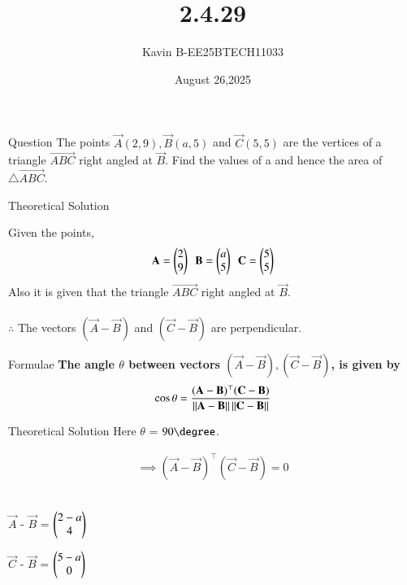 \documentclass{beamer}
\begin{document}
\title 
{2.4.29}
\date{August 26,2025}


\author 
{Kavin B-EE25BTECH11033}






\frame{\titlepage}
\begin{frame}{Question}
The points $\vec{A}(2, 9), \vec{B}(a, 5) $ and $\vec{C}(5, 5)$ are the vertices of a triangle $\vec{ABC}$ right angled at $\vec{B}$. Find the values of a and hence the area of $\triangle \vec{ABC}$.
\end{frame}



\begin{frame}{Theoretical Solution}

Given the points,
\begin{align}
    \vec{A}=\begin{myvec}{2\\9}\end{myvec}\ \ 
    \vec{B}=\begin{myvec}{a\\5}\end{myvec}\ \ 
    \vec{C}=\begin{myvec}{5\\5}\end{myvec}
\end{align}
Also it is given that the triangle $\vec{ABC}$ right angled at $\vec{B}$.\\
\\
$\therefore$ The vectors $(\vec{A}-\vec{B})$ and $(\vec{C}-\vec{B})$ are perpendicular.\\
\end{frame}

\begin{frame}{Formulae}
\textbf{The angle $\theta$ between vectors $(\vec{A}-\vec{B}), (\vec{C}-\vec{B})$, is given by } 
\begin{align}
	\label{eq:angle-inner}
		\cos\theta=\frac{{(\vec{A}-\vec{B})^{\top}}{(\vec{C}-\vec{B})}}{\norm{\vec{A}-\vec{B}}\norm{\vec{C}-\vec{B}}}
\end{align}
\end{frame}


\begin{frame}{Theoretical Solution}
Here $\theta$ = $90\degree$.

\begin{align}
\implies {(\vec{A}-\vec{B})^{\top}}{(\vec{C}-\vec{B})} = 0
\end{align}\\
\begin{center}
$\vec{A}$ - $\vec{B}$ = $\myvec{2-a\\4}$
\end{center}
\begin{center}
$\vec{C}$ - $\vec{B}$ = $\myvec{5-a\\0}$
\end{center}

\end{frame}
\end{document}
